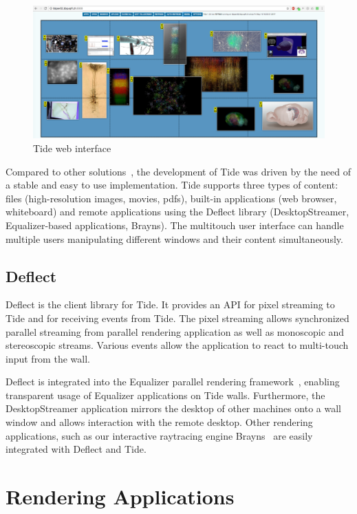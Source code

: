 \documentclass[10pt]{llncs}
\begin{document}
\begin{figure}[h!t]
  \includegraphics[width=\columnwidth]{images/tideweb}
  \caption{\label{fTideWeb}Tide web interface}
\end{figure}

Compared to other solutions~\cite{Sage,Sage2,DisplayCluster}, the development of
Tide was driven by the need of a stable and easy to use implementation. Tide
supports three types of content: files (high-resolution images, movies, pdfs),
built-in applications (web browser, whiteboard) and remote applications using
the Deflect library (DesktopStreamer, Equalizer-based applications, Brayns).
The multitouch user interface can handle multiple users manipulating different
windows and their content simultaneously.

\subsection{Deflect}

Deflect is the client library for Tide. It provides an API for pixel streaming
to Tide and for receiving events from Tide. The pixel streaming allows
synchronized parallel streaming from parallel rendering application as well as
monoscopic and stereoscopic streams. Various events allow the application to
react to multi-touch input from the wall.

Deflect is integrated into the Equalizer parallel rendering
framework~\cite{EMP:09}, enabling transparent usage of Equalizer applications on
Tide walls. Furthermore, the DesktopStreamer application mirrors the desktop of
other machines onto a wall window and allows interaction with the remote
desktop. Other rendering applications, such as our interactive raytracing
engine Brayns~\cite{brayns} are easily integrated with Deflect and Tide.


\section{Rendering Applications}
\end{document}
